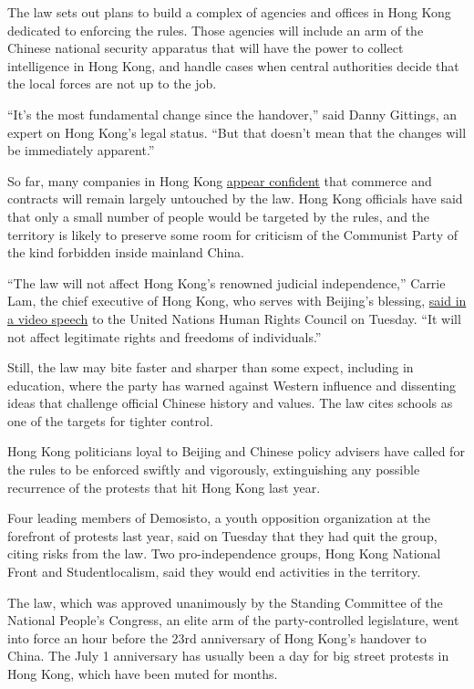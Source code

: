 The law sets out plans to build a complex of agencies and offices in
Hong Kong dedicated to enforcing the rules. Those agencies will include
an arm of the Chinese national security apparatus that will have the
power to collect intelligence in Hong Kong, and handle cases when
central authorities decide that the local forces are not up to the job.

``It's the most fundamental change since the handover,'' said Danny
Gittings, an expert on Hong Kong's legal status. ``But that doesn't mean
that the changes will be immediately apparent.''

So far, many companies in Hong Kong
\href{https://www.nytimes.com/2020/06/30/business/china-hong-kong-security-law-business.html}{appear
confident} that commerce and contracts will remain largely untouched by
the law. Hong Kong officials have said that only a small number of
people would be targeted by the rules, and the territory is likely to
preserve some room for criticism of the Communist Party of the kind
forbidden inside mainland China.

``The law will not affect Hong Kong's renowned judicial independence,''
Carrie Lam, the chief executive of Hong Kong, who serves with Beijing's
blessing,
\href{https://www.info.gov.hk/gia/general/202006/30/P2020063000655.htm}{said
in a video speech} to the United Nations Human Rights Council on
Tuesday. ``It will not affect legitimate rights and freedoms of
individuals.''

Still, the law may bite faster and sharper than some expect, including
in education, where the party has warned against Western influence and
dissenting ideas that challenge official Chinese history and values. The
law cites schools as one of the targets for tighter control.

Hong Kong politicians loyal to Beijing and Chinese policy advisers have
called for the rules to be enforced swiftly and vigorously,
extinguishing any possible recurrence of the protests that hit Hong Kong
last year.

Four leading members of Demosisto, a youth opposition organization at
the forefront of protests last year, said on Tuesday that they had quit
the group, citing risks from the law. Two pro-independence groups, Hong
Kong National Front and Studentlocalism, said they would end activities
in the territory.

The law, which was approved unanimously by the Standing Committee of the
National People's Congress, an elite arm of the party-controlled
legislature, went into force an hour before the 23rd anniversary of Hong
Kong's handover to China. The July 1 anniversary has usually been a day
for big street protests in Hong Kong, which have been muted for months.

